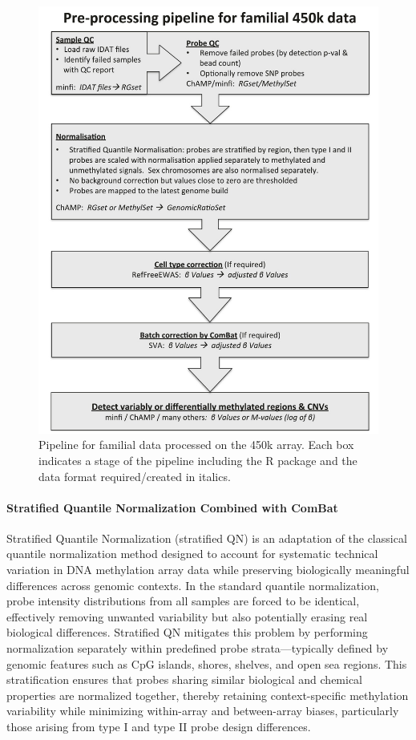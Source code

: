 \documentclass[10pt]{extarticle}
\begin{document}
\begin{figure}[h]
  \centering
  \includegraphics[width=0.5\linewidth]{Figures/Pipeline for familial data processed on the 450k array. Each box indicates a stage of the pipeline including the R package and the data.jpg}
  \caption{Pipeline for familial data processed on the 450k array. Each box indicates a stage of the pipeline including the R package and the data
format required/created in italics.}
  \label{fig:pipeline}
\end{figure}

\paragraph{Stratified Quantile Normalization Combined with ComBat}
Stratified Quantile Normalization (stratified QN) is an adaptation of the classical quantile normalization method designed to account for systematic technical variation in DNA methylation array data while preserving biologically meaningful differences across genomic contexts. In the standard quantile normalization, probe intensity distributions from all samples are forced to be identical, effectively removing unwanted variability but also potentially erasing real biological differences. Stratified QN mitigates this problem by performing normalization separately within predefined probe strata—typically defined by genomic features such as CpG islands, shores, shelves, and open sea regions. This stratification ensures that probes sharing similar biological and chemical properties are normalized together, thereby retaining context-specific methylation variability while minimizing within-array and between-array biases, particularly those arising from type I and type II probe design differences.
\end{document}
